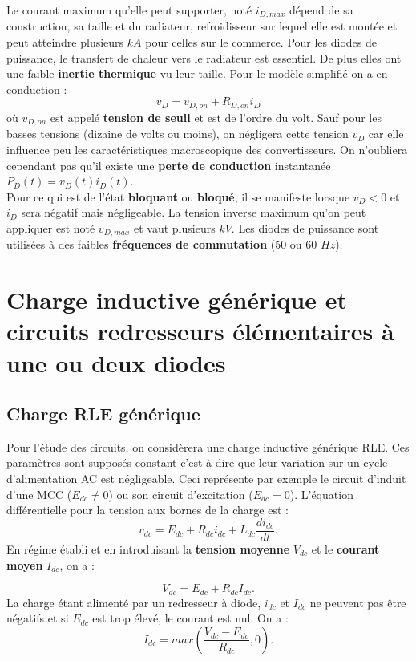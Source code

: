 		Le courant maximum qu'elle peut supporter, noté $i_{D,max}$ dépend de sa construction, sa taille et du radiateur, refroidisseur sur lequel elle est montée et peut atteindre plusieurs $kA$ pour celles sur le commerce. Pour les diodes de puissance, le transfert de chaleur vers le radiateur est essentiel. De plus elles ont une faible \textbf{inertie thermique} vu leur taille. Pour le modèle simplifié on a en conduction :
		\begin{equation}
			v_D = v_{D,on} + R_{D,on} i_D
		\end{equation}
		où $v_{D,on}$ est appelé \textbf{tension de seuil} et est de l'ordre du volt. Sauf pour les basses tensions (dizaine de volts ou moins), on négligera cette tension $v_D$ car elle influence peu les caractéristiques macroscopique des convertisseurs. On n'oubliera cependant pas qu'il existe une \textbf{perte de conduction} instantanée $P_D(t) = v_D(t)i_D(t)$. \\
	
		Pour ce qui est de l'état \textbf{bloquant} ou \textbf{bloqué}, il se manifeste lorsque $v_D < 0$ et $i_D$ sera négatif mais négligeable. La tension inverse maximum qu'on peut appliquer est noté $v_{D,max}$ et vaut plusieurs $kV$. Les diodes de puissance sont utilisées à des faibles \textbf{fréquences de commutation} (50 ou 60 $Hz$).
	
	\section{Charge inductive générique et circuits redresseurs élémentaires à une ou deux diodes}
		\subsection{Charge RLE générique}
			Pour l'étude des circuits, on considèrera une charge inductive générique RLE. Ces paramètres sont supposés constant c'est à dire que leur variation sur un cycle d'alimentation AC est négligeable. Ceci représente par exemple le circuit d'induit d'une MCC ($E_{dc}\neq 0$) ou son circuit d'excitation ($E_{dc}=0$). L'équation différentielle pour la tension aux bornes de la charge est :
			\begin{equation}
				v_{dc} = E_{dc} + R_{dc}i_{dc} + L_{dc}\frac{di_{dc}}{dt}.
			\end{equation}
			En régime établi et en introduisant la \textbf{tension moyenne} $V_{dc}$ et le \textbf{courant moyen} $I_{dc}$, on a :
			
			\begin{equation}
				V_{dc} = E_{dc} + R_{dc} I_{dc}.
			\end{equation}
			La charge étant alimenté par un redresseur à diode, $i_{dc}$ et $I_{dc}$ ne peuvent pas être négatifs et si $E_{dc}$ est trop élevé, le courant est nul. On a :
			\begin{equation}
				I_{dc} = max\left(\frac{V_{dc} - E_{dc}}{R_{dc}}, 0\right).
			\end{equation}
			
